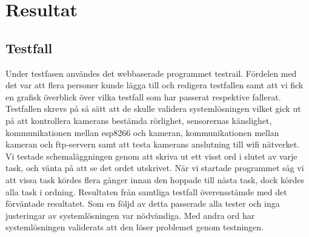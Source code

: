 

\chapter{Resultat} %
\label{ch:resultat}


\ifpdf
    \graphicspath{{6/figures/PNG/}{6/figures/PDF/}{6/figures/}}
\else
    \graphicspath{{6/figures/EPS/}{6/figures/}}
\fi



\section{Testfall}
Under testfasen användes det webbaserade programmet testrail. Fördelen med det var att flera personer kunde lägga till och redigera testfallen samt att vi fick en grafisk överblick över vilka testfall som har passerat respektive fallerat. 
Testfallen skrevs på så sätt att de skulle validera systemlösningen vilket gick ut på att kontrollera kamerans bestämda rörlighet, sensorernas känslighet, kommunikationen mellan esp8266 och kameran, kommunikationen mellan kameran och ftp-servern samt att testa kamerans anslutning till wifi nätverket.
Vi testade schemaläggningen genom att skriva ut ett visst ord i slutet av varje task, och vänta på att se det ordet utskrivet. När vi startade programmet såg vi att vissa task kördes flera gånger innan den hoppade till nästa task, dock kördes alla task i ordning. 
Resultaten från samtliga testfall överensstämde med det förväntade resultatet. Som en följd av detta passerade alla tester och inga justeringar av systemlösningen var nödvändiga. Med andra ord har systemlösningen validerats att den löser problemet genom testningen.



